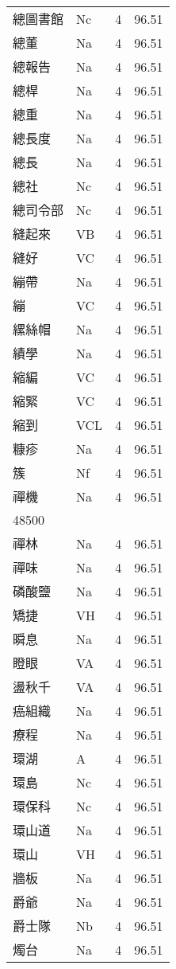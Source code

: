 \documentclass[twocolumn]{book}
\begin{document}
\begin{supertabular}{llrr}
總圖書館 & Nc & 4 &  96.51\\
總董 & Na & 4 &  96.51\\
總報告 & Na & 4 &  96.51\\
總桿 & Na & 4 &  96.51\\
總重 & Na & 4 &  96.51\\
總長度 & Na & 4 &  96.51\\
總長 & Na & 4 &  96.51\\
總社 & Nc & 4 &  96.51\\
總司令部 & Nc & 4 &  96.51\\
縫起來 & VB & 4 &  96.51\\
縫好 & VC & 4 &  96.51\\
繃帶 & Na & 4 &  96.51\\
繃 & VC & 4 &  96.51\\
縲絲帽 & Na & 4 &  96.51\\
績學 & Na & 4 &  96.51\\
縮編 & VC & 4 &  96.51\\
縮緊 & VC & 4 &  96.51\\
縮到 & VCL & 4 &  96.51\\
糠疹 & Na & 4 &  96.51\\
簇 & Nf & 4 &  96.51\\
禪機 & Na & 4 &  96.51\\
48500\\
禪林 & Na & 4 &  96.51\\
禪味 & Na & 4 &  96.51\\
磷酸鹽 & Na & 4 &  96.51\\
矯捷 & VH & 4 &  96.51\\
瞬息 & Na & 4 &  96.51\\
瞪眼 & VA & 4 &  96.51\\
盪秋千 & VA & 4 &  96.51\\
癌組織 & Na & 4 &  96.51\\
療程 & Na & 4 &  96.51\\
環湖 & A & 4 &  96.51\\
環島 & Nc & 4 &  96.51\\
環保科 & Nc & 4 &  96.51\\
環山道 & Na & 4 &  96.51\\
環山 & VH & 4 &  96.51\\
牆板 & Na & 4 &  96.51\\
爵爺 & Na & 4 &  96.51\\
爵士隊 & Nb & 4 &  96.51\\
燭台 & Na & 4 &  96.51\\

\end{supertabular}
\end{document}
